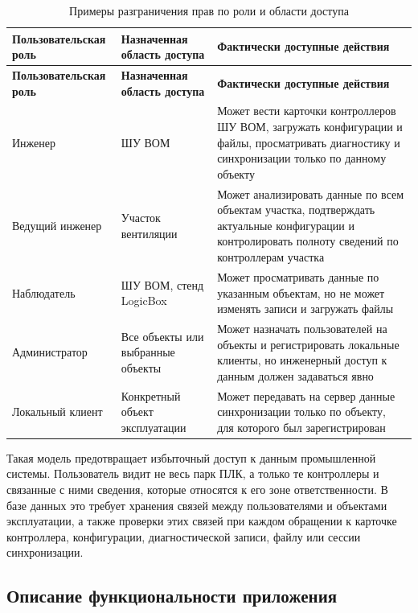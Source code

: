 \small
\begin{longtable}{|p{}|p{}|p{}|}
    \caption{Примеры разграничения прав по роли и области доступа} \label{tab:access_examples} \\
    \hline
    \textbf{Пользовательская роль} & \textbf{Назначенная область доступа} & \textbf{Фактически доступные действия} \\ \hline
    \endfirsthead
    \tabcont{\ref{tab:access_examples}}
    \textbf{Пользовательская роль} & \textbf{Назначенная область доступа} & \textbf{Фактически доступные действия} \\ \hline
    \endhead
    \hline
    \endfoot
    \hline
    \endlastfoot

    Инженер & ШУ ВОМ & Может вести карточки контроллеров ШУ ВОМ, загружать конфигурации и файлы, просматривать диагностику и синхронизации только по данному объекту \\ \hline
    Ведущий инженер & Участок вентиляции & Может анализировать данные по всем объектам участка, подтверждать актуальные конфигурации и контролировать полноту сведений по контроллерам участка \\ \hline
    Наблюдатель & ШУ ВОМ, стенд LogicBox & Может просматривать данные по указанным объектам, но не может изменять записи и загружать файлы \\ \hline
    Администратор & Все объекты или выбранные объекты & Может назначать пользователей на объекты и регистрировать локальные клиенты, но инженерный доступ к данным должен задаваться явно \\ \hline
    Локальный клиент & Конкретный объект эксплуатации & Может передавать на сервер данные синхронизации только по объекту, для которого был зарегистрирован \\ \hline
\end{longtable}
\normalsize

Такая модель предотвращает избыточный доступ к данным промышленной системы. Пользователь видит не весь парк ПЛК, а только те контроллеры и связанные с ними сведения, которые относятся к его зоне ответственности. В базе данных это требует хранения связей между пользователями и объектами эксплуатации, а также проверки этих связей при каждом обращении к карточке контроллера, конфигурации, диагностической записи, файлу или сессии синхронизации.

\subsection{Описание функциональности приложения}

